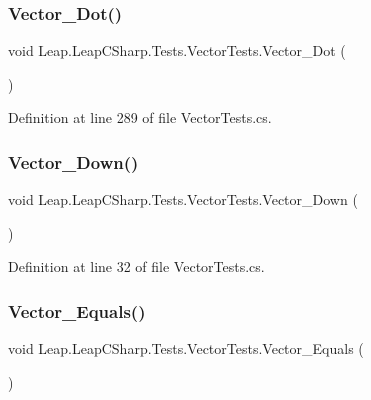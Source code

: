 \subsubsection{\texorpdfstring{Vector\_Dot()}{Vector\_Dot()}}
{\footnotesize\ttfamily void Leap.\+Leap\+C\+Sharp.\+Tests.\+Vector\+Tests.\+Vector\+\_\+\+Dot (\begin{DoxyParamCaption}{ }\end{DoxyParamCaption})}



Definition at line 289 of file Vector\+Tests.\+cs.

\mbox{\label{class_leap_1_1_leap_c_sharp_1_1_tests_1_1_vector_tests_a6159c18ccab6432095cc32bdb920ca13}} 
\subsubsection{\texorpdfstring{Vector\_Down()}{Vector\_Down()}}
{\footnotesize\ttfamily void Leap.\+Leap\+C\+Sharp.\+Tests.\+Vector\+Tests.\+Vector\+\_\+\+Down (\begin{DoxyParamCaption}{ }\end{DoxyParamCaption})}



Definition at line 32 of file Vector\+Tests.\+cs.

\mbox{\label{class_leap_1_1_leap_c_sharp_1_1_tests_1_1_vector_tests_ad4a8f7fbb8f738bba7142e027446bcd5}} 
\subsubsection{\texorpdfstring{Vector\_Equals()}{Vector\_Equals()}}
{\footnotesize\ttfamily void Leap.\+Leap\+C\+Sharp.\+Tests.\+Vector\+Tests.\+Vector\+\_\+\+Equals (\begin{DoxyParamCaption}{ }\end{DoxyParamCaption})}



